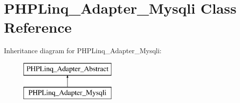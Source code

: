 \hypertarget{class_p_h_p_linq___adapter___mysqli}{\section{\-P\-H\-P\-Linq\-\_\-\-Adapter\-\_\-\-Mysqli \-Class \-Reference}
\label{class_p_h_p_linq___adapter___mysqli}
}
\-Inheritance diagram for \-P\-H\-P\-Linq\-\_\-\-Adapter\-\_\-\-Mysqli\-:\begin{figure}[H]
\begin{center}
\leavevmode
\includegraphics[height=2.000000cm]{class_p_h_p_linq___adapter___mysqli}
\end{center}
\end{figure}
